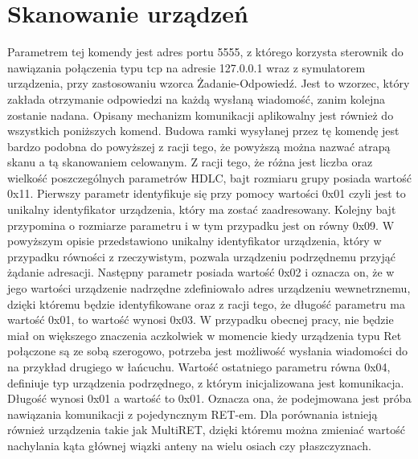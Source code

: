 \section{Skanowanie urządzeń}
Parametrem tej komendy jest adres portu 5555, z którego korzysta sterownik
do nawiązania połączenia typu tcp na adresie 127.0.0.1 wraz z symulatorem urządzenia,
przy zastosowaniu wzorca Żadanie-Odpowiedź. Jest to wzorzec, który zakłada otrzymanie odpowiedzi na każdą wysłaną wiadomość, zanim kolejna zostanie nadana. 
Opisany mechanizm komunikacji aplikowalny jest również do wszystkich poniższych komend.
\newline\newline
Budowa ramki wysyłanej przez tę komendę jest bardzo podobna do powyższej z racji tego, że powyższą można nazwać atrapą skanu a tą skanowaniem celowanym.
Z racji tego, że różna jest liczba oraz wielkość poszczególnych parametrów HDLC, bajt rozmiaru grupy posiada wartość 0x11.
\newline
Pierwszy parametr identyfikuje się przy pomocy wartości 0x01 czyli jest to unikalny identyfikator urządzenia, który ma zostać zaadresowany.
Kolejny bajt przypomina o rozmiarze parametru i w tym przypadku jest on równy 0x09. W powyższym opisie przedstawiono unikalny identyfikator urządzenia, który w przypadku
równości z rzeczywistym, pozwala urządzeniu podrzędnemu przyjąć żądanie adresacji.
\newline
Następny parametr posiada wartość 0x02 i oznacza on, że w jego wartości urządzenie nadrzędne zdefiniowało adres urządzeniu wewnetrznemu, dzięki któremu
będzie identyfikowane oraz z racji tego, że długość parametru ma wartość 0x01, to wartość wynosi 0x03. W przypadku obecnej pracy, nie będzie miał on większego znaczenia
aczkolwiek w momencie kiedy urządzenia typu Ret połączone są ze sobą szerogowo, potrzeba jest możliwość wysłania wiadomości do na przykład drugiego w łańcuchu.
\newline
Wartość ostatniego parametru równa 0x04, definiuje typ urządzenia podrzędnego, z którym inicjalizowana jest komunikacja. Długość wynosi 0x01 a wartość to 0x01.
Oznacza ona, że podejmowana jest próba nawiązania komunikacji z pojedyncznym RET-em.
Dla porównania istnieją również urządzenia takie jak MultiRET, dzięki któremu można zmieniać wartość nachylania kąta głównej wiązki anteny na wielu osiach czy płaszczyznach.
